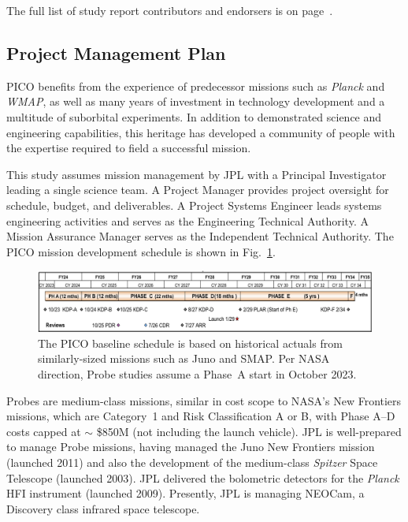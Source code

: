 The full list of study report contributors and endorsers is on page~\pageref{authorlist}.

\subsection{Project Management Plan}
\label{sec:management_plan} %

PICO benefits from the experience of predecessor missions such as
\textit{Planck} and \textit{WMAP}, as well as many years of investment
in technology development and a multitude of suborbital
experiments. In addition to demonstrated science and engineering
capabilities, this heritage has developed a community of people with
the expertise required to field a successful mission.

This study assumes mission management by JPL with a Principal
Investigator leading a single science team. A Project Manager provides
project oversight for schedule, budget, and deliverables. A Project
Systems Engineer leads systems engineering activities and serves as
the Engineering Technical Authority. A Mission Assurance Manager
serves as the Independent Technical Authority. The PICO mission
development schedule is shown in Fig.~\ref{fig:Schedule}.

\begin{figure}[hb]
\begin{center}
\includegraphics[width=\textwidth]{figures/Schedule.png}
\caption{\captiontext
  The PICO baseline schedule is based on historical actuals
  from similarly-sized missions such as Juno and
  SMAP. Per NASA direction, Probe studies assume a Phase~A start in October 2023.\label{fig:Schedule}}
\end{center}
\end{figure}

Probes are medium-class missions, similar in cost scope to NASA's
New Frontiers missions, which are Category~1 and Risk Classification A
or B, with Phase A--D costs capped at $\sim$ \$850M (not including the
launch vehicle). JPL is well-prepared to manage Probe missions, having
managed the Juno New Frontiers mission (launched 2011) and also the
development of the medium-class \textit{Spitzer} Space Telescope (launched
2003). JPL delivered the bolometric detectors for the \textit{Planck}
HFI instrument (launched 2009). Presently, JPL is managing NEOCam, a
Discovery class infrared space telescope.

